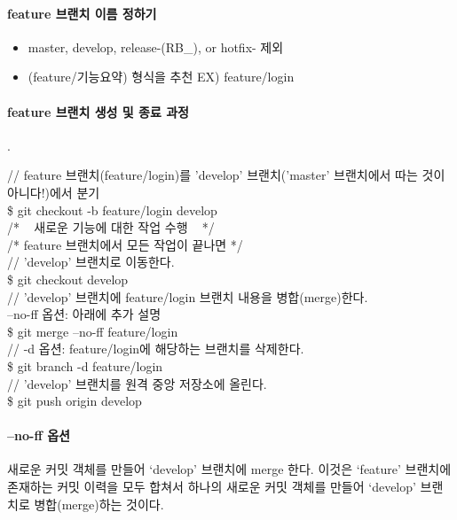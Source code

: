 \documentclass[12pt, a4paper, oneside]{book}
\begin{document}
		\paragraph{feature 브랜치 이름 정하기}

		\begin{itemize}
			\item		master, develop, release-(RB\_), or hotfix- 제외
			\item		(feature/기능요약) 형식을 추천 EX) feature/login
		\end{itemize}


		\paragraph{feature 브랜치 생성 및 종료 과정}
		.\\	


		\begin{tcolorbox}
			// feature 브랜치(feature/login)를 'develop' 브랜치('master' 브랜치에서 따는 것이 아니다!)에서 분기\\
			\$ git checkout -b feature/login develop\\
			/* ~ 새로운 기능에 대한 작업 수행 ~ */\\

		/* feature 브랜치에서 모든 작업이 끝나면 */\\
		// 'develop' 브랜치로 이동한다.\\
		\$ git checkout develop \\
		// 'develop' 브랜치에 feature/login 브랜치 내용을 병합(merge)한다. \\
		 --no-ff 옵션: 아래에 추가 설명\\
		\$ git merge --no-ff feature/login\\
		// -d 옵션: feature/login에 해당하는 브랜치를 삭제한다.\\
		\$ git branch -d feature/login	\\
		// 'develop' 브랜치를 원격 중앙 저장소에 올린다.	\\
		\$ git push origin develop 
		\end{tcolorbox}

		\paragraph{--no-ff 옵션}
		새로운 커밋 객체를 만들어 ‘develop’ 브랜치에 merge 한다.
		이것은 ‘feature’ 브랜치에 존재하는 커밋 이력을 모두 합쳐서 
		하나의 새로운 커밋 객체를 만들어 ‘develop’ 브랜치로 병합(merge)하는 것이다.
\end{document}
